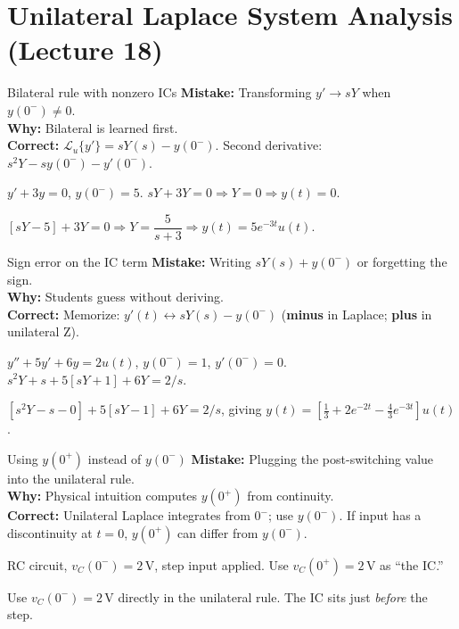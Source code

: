 \documentclass[11pt]{article}
\begin{document}
\section{Unilateral Laplace System Analysis (Lecture 18)}

\begin{pitfallbox}{Bilateral rule with nonzero ICs}
\textbf{Mistake:} Transforming $y'\to sY$ when $y(0^-)\ne 0$.\\
\textbf{Why:} Bilateral is learned first.\\
\textbf{Correct:} $\mathcal{L}_u\{y'\} = sY(s) - y(0^-)$. Second derivative: $s^2 Y - s y(0^-) - y'(0^-)$.
\begin{wrongbox}
$y' + 3y = 0$, $y(0^-) = 5$. $sY + 3Y = 0 \Rightarrow Y = 0 \Rightarrow y(t) = 0$.
\end{wrongbox}
\begin{rightbox}
$[sY - 5] + 3Y = 0 \Rightarrow Y = \dfrac{5}{s+3} \Rightarrow y(t) = 5 e^{-3t} u(t)$.
\end{rightbox}
\end{pitfallbox}

\begin{pitfallbox}{Sign error on the IC term}
\textbf{Mistake:} Writing $sY(s) + y(0^-)$ or forgetting the sign.\\
\textbf{Why:} Students guess without deriving.\\
\textbf{Correct:} Memorize: $y'(t) \leftrightarrow sY(s) - y(0^-)$ (\textbf{minus} in Laplace; \textbf{plus} in unilateral Z).
\begin{wrongbox}
$y'' + 5y' + 6y = 2u(t)$, $y(0^-)=1$, $y'(0^-)=0$.\\
$s^2 Y + s + 5[sY + 1] + 6Y = 2/s$.
\end{wrongbox}
\begin{rightbox}
$[s^2 Y - s - 0] + 5[sY - 1] + 6Y = 2/s$, giving
$y(t) = \left[\tfrac{1}{3} + 2 e^{-2t} - \tfrac{4}{3} e^{-3t}\right] u(t)$.
\end{rightbox}
\end{pitfallbox}

\begin{pitfallbox}{Using $y(0^+)$ instead of $y(0^-)$}
\textbf{Mistake:} Plugging the post-switching value into the unilateral rule.\\
\textbf{Why:} Physical intuition computes $y(0^+)$ from continuity.\\
\textbf{Correct:} Unilateral Laplace integrates from $0^-$; use $y(0^-)$. If input has a discontinuity at $t=0$, $y(0^+)$ can differ from $y(0^-)$.
\begin{wrongbox}
RC circuit, $v_C(0^-) = 2$\,V, step input applied. Use $v_C(0^+) = 2$\,V as ``the IC.''
\end{wrongbox}
\begin{rightbox}
Use $v_C(0^-)=2$\,V directly in the unilateral rule. The IC sits just \emph{before} the step.
\end{rightbox}
\end{pitfallbox}
\end{document}
